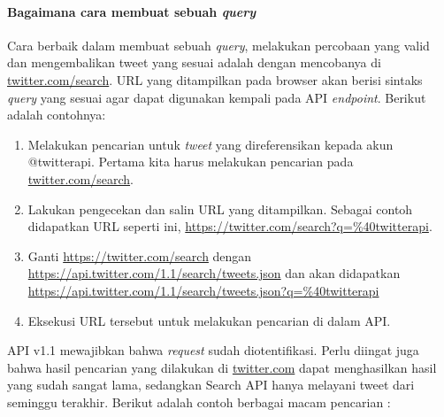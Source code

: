 \paragraph{Bagaimana cara membuat sebuah \textit{query}}
Cara berbaik dalam membuat sebuah \textit{query}, melakukan percobaan yang valid dan mengembalikan tweet yang sesuai adalah dengan mencobanya di \url{twitter.com/search}. URL yang ditampilkan pada browser akan berisi sintaks \textit{query} yang sesuai agar dapat digunakan kempali pada API \textit{endpoint}. Berikut adalah contohnya:

\begin{enumerate}
	\item Melakukan pencarian untuk \textit{tweet} yang direferensikan kepada akun @twitterapi. Pertama kita harus melakukan pencarian pada \url{twitter.com/search}.
	\item Lakukan pengecekan dan salin URL yang ditampilkan. Sebagai contoh didapatkan URL seperti ini, \url{https://twitter.com/search?q=\%40twitterapi}.
	\item Ganti \url{https://twitter.com/search} dengan \url{https://api.twitter.com/1.1/search/tweets.json} dan akan didapatkan \url{https://api.twitter.com/1.1/search/tweets.json?q=\%40twitterapi}
	\item Eksekusi URL tersebut untuk melakukan pencarian di dalam API.
\end{enumerate}

API v1.1 mewajibkan bahwa \textit{request} sudah diotentifikasi. Perlu diingat juga bahwa hasil pencarian yang dilakukan di \url{twitter.com} dapat menghasilkan hasil yang sudah sangat lama, sedangkan Search API hanya melayani tweet dari seminggu terakhir. Berikut adalah contoh berbagai macam pencarian :

